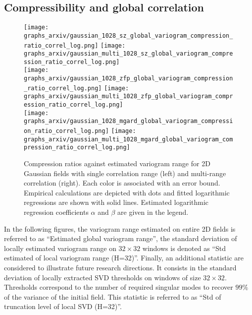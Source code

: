 \documentclass[conference]{IEEEtran}
\begin{document}
\subsection{Compressibility and global correlation}


% 
\begin{figure}
\centering
{\texttt{[image: graphs\_arxiv/gaussian\_1028\_sz\_global\_variogram\_compression\_ratio\_correl\_log.png]}} \hspace{-10pt} \texttt{[image: graphs\_arxiv/gaussian\_multi\_1028\_sz\_global\_variogram\_compression\_ratio\_correl\_log.png]} \\ 
{\texttt{[image: graphs\_arxiv/gaussian\_1028\_zfp\_global\_variogram\_compression\_ratio\_correl\_log.png]}} \hspace{-10pt} 
\texttt{[image: graphs\_arxiv/gaussian\_multi\_1028\_zfp\_global\_variogram\_compression\_ratio\_correl\_log.png]} \\ 
{\texttt{[image: graphs\_arxiv/gaussian\_1028\_mgard\_global\_variogram\_compression\_ratio\_correl\_log.png]}} \hspace{-10pt} \texttt{[image: graphs\_arxiv/gaussian\_multi\_1028\_mgard\_global\_variogram\_compression\_ratio\_correl\_log.png]} 
\vspace{-10pt}
\caption{Compression ratios against estimated variogram range for 2D Gaussian fields with single correlation range (left) and multi-range correlation (right). 
Each color is associated with  an error bound.
Empirical calculations are depicted with  dots and fitted logarithmic regressions are shown with solid lines. 
Estimated logarithmic regression coefficients $\alpha$ and $\beta$ are given in the legend.}
\label{results_gaussian}
\vspace{-10pt}
\end{figure}
%

In the following figures, the variogram range estimated on entire 2D fields is referred  to as ``Estimated global variogram range'', the standard deviation of locally estimated variogram range on $32\times 32$ windows is denoted as ``Std  estimated of local variogram range (H=32)''. 
Finally, an additional statistic are considered to illustrate future research directions. 
It consists in the standard deviation of locally extracted SVD thresholds on windows of size $32\times 32$. Thresholds correspond to the  number of required singular modes to recover $99\%$ of the variance of the initial field. 
This statistic is  referred to as ``Std of  truncation level of local SVD (H=32)''. 
\end{document}
